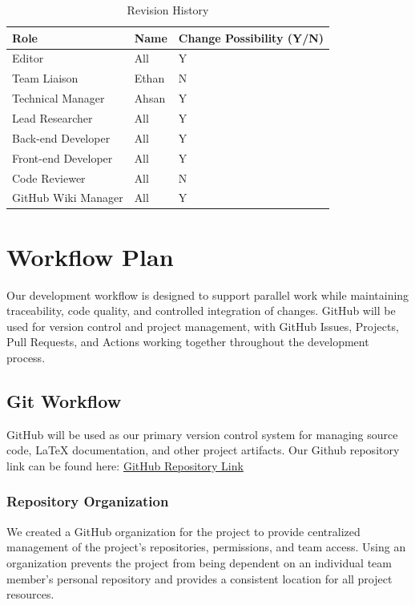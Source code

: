 \documentclass{article}
\begin{document}
\begin{table}[H]
\caption{Revision History} \label{RoleAssignments}
\begin{tabularx}{\textwidth}{llX}
\toprule
\textbf{Role} & \textbf{Name} & \textbf{Change Possibility (Y/N)} \\
\midrule
Editor & All & Y \\
Team Liaison & Ethan & N \\
Technical Manager & Ahsan & Y \\
Lead Researcher & All & Y \\
Back-end Developer & All & Y \\
Front-end Developer & All & Y \\
Code Reviewer & All & N \\
GitHub Wiki Manager & All & Y \\

\bottomrule
\end{tabularx}
\end{table}
\section{Workflow Plan}

Our development workflow is designed to support parallel work while maintaining
traceability, code quality, and controlled integration of changes. GitHub will
be used for version control and project management, with GitHub Issues,
Projects, Pull Requests, and Actions working together throughout the
development process.



\subsection{Git Workflow}

GitHub will be used as our primary version control system for managing source
code, \LaTeX{} documentation, and other project artifacts. Our Github repository link 
can be found here: \href{https://github.com/team-hindsight/ophthamology-game}{GitHub Repository Link}


\subsubsection{Repository Organization}

We created a GitHub organization for the project to provide centralized
management of the project's repositories, permissions, and team access.
Using an organization prevents the project from being dependent on an
individual team member's personal repository and provides a consistent
location for all project resources.
\end{document}
